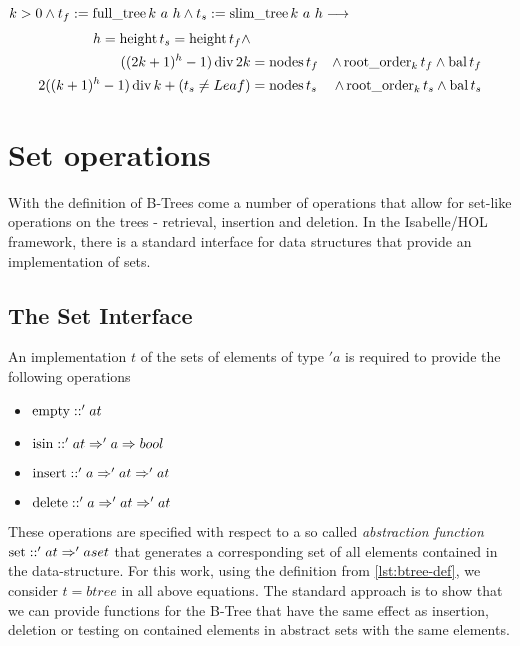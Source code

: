 \begin{theorem}
    $k > 0 \wedge t_f := \operatorname{full\_tree} k\ a\ h \wedge t_s := \operatorname{slim\_tree} k\ a\ h \longrightarrow$
    \begin{align}
    h = \operatorname{height} t_s = \operatorname{height} t_f \wedge \\
        ((2k+1)^h - 1) \operatorname{div} 2k &= \operatorname{nodes} t_f &\wedge \operatorname{root\_order}_k t_f \wedge \operatorname{bal} t_f \\ 
        2((k+1)^h - 1) \operatorname{div} k + (t_s \neq Leaf) &= \operatorname{nodes} t_s &\wedge \operatorname{root\_order}_k t_s \wedge \operatorname{bal} t_s
    \end{align}
\end{theorem}


\section{Set operations}

With the definition of B-Trees come a number of operations that allow for set-like operations
on the trees - retrieval, insertion and deletion.
In the Isabelle/HOL framework, there is a standard interface
for data structures that provide an implementation of sets.

\subsection{The Set Interface}

An implementation $t$ of the sets of elements of type $'a$ is required to provide the following
operations

\begin{itemize}
    \item $\operatorname{empty} :: 'a t$
    \item $\operatorname{isin} :: 'a t \Rightarrow 'a \Rightarrow bool$
    \item $\operatorname{insert} :: 'a \Rightarrow 'a t \Rightarrow 'a t$
    \item $\operatorname{delete} :: 'a \Rightarrow 'a t \Rightarrow 'a t$
\end{itemize}

These operations are specified with respect to a so called \textit{abstraction function}
$\operatorname{set} :: 'a t \Rightarrow 'a set$ that generates a corresponding set of all elements
contained in the data-structure.
For this work, using the definition from \autoref{lst:btree-def},
we consider $t = btree$ in all above equations.
The standard approach is to show that we can provide functions for the B-Tree
that have the same effect as insertion, deletion or testing on contained elements
in abstract sets with the same elements.

